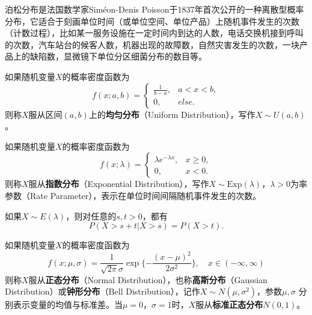 泊松分布是法国数学家Sim\'{e}on-Denis Poisson于1837年首次公开的一种离散型概率分布，它适合于刻画单位时间（或单位空间、单位产品）上随机事件发生的次数（计数过程），比如某一服务设施在一定时间内到达的人数，电话交换机接到呼叫的次数，汽车站台的候客人数，机器出现的故障数，自然灾害发生的次数，一块产品上的缺陷数，显微镜下单位分区细菌分布的数目等。

\begin{definition}[均匀分布]
如果随机变量$X$的概率密度函数为
\begin{equation}
    f(x;a, b) = \left\{
        \begin{array}{rl}
          \frac{1}{b-a}, & a < x < b, \\
          0, & else.
        \end{array}
        \right.
\end{equation}
则称$X$服从区间$(a,b)$上的\textbf{均匀分布}（Uniform Distribution），写作$X\sim U(a,b)$。
\end{definition}

\begin{definition}[指数分布]
如果随机变量$X$的概率密度函数为
\begin{equation}
    f(x;\lambda) = \left\{
        \begin{array}{rl}
          \lambda e^{-\lambda x}, & x \ge 0, \\
          0, & x < 0.
        \end{array}
        \right.
\end{equation}
则称$X$服从\textbf{指数分布}（Exponential Distribution），写作$X\sim \mathrm{Exp}(\lambda)$，$\lambda>0$为率参数（Rate Parameter），表示在单位时间间隔随机事件发生的次数。
\end{definition}

\begin{theorem}[指数分布的无记忆性]
如果$X\sim E(\lambda)$，则对任意的$s,t>0$，都有
\begin{equation}
    P(X > s+t | X>s) = P(X>t).
\end{equation}
\end{theorem}

\begin{definition}[正态分布]
如果随机变量$X$的概率密度函数为
\begin{equation}
    f(x;\mu,\sigma) = \frac{1}{\sqrt{2\pi}\sigma} \exp\{-\frac{(x-\mu)^2}{2\sigma^2}\},\quad x\in (-\infty,\infty)
\end{equation}
则称$X$服从\textbf{正态分布}（Normal Distribution），也称\textbf{高斯分布}（Gaussian Distribution）或\textbf{钟形分布}（Bell Distribution），记作$X\sim N(\mu,\sigma^2)$，参数$\mu,\sigma$ 分别表示变量的均值与标准差。当$\mu=0$，$\sigma=1$时，$X$服从\textbf{标准正态分布}$N(0,1)$。
\end{definition}

